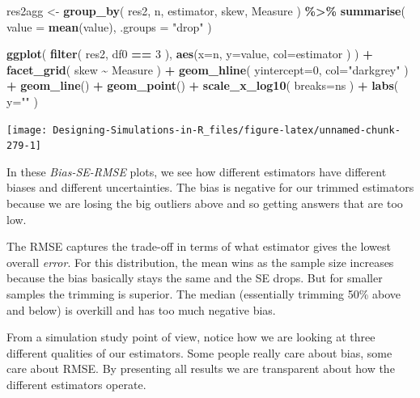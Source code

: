 \documentclass[
]{book}
\newenvironment{Shaded}{\begin{snugshade}}{\end{snugshade}}
\newcommand{\AttributeTok}[1]{\textcolor[rgb]{0.13,0.29,0.53}{#1}}
\newcommand{\DecValTok}[1]{\textcolor[rgb]{0.00,0.00,0.81}{#1}}
\newcommand{\FunctionTok}[1]{\textcolor[rgb]{0.13,0.29,0.53}{\textbf{#1}}}
\newcommand{\NormalTok}[1]{#1}
\newcommand{\OtherTok}[1]{\textcolor[rgb]{0.56,0.35,0.01}{#1}}
\newcommand{\SpecialCharTok}[1]{\textcolor[rgb]{0.81,0.36,0.00}{\textbf{#1}}}
\newcommand{\StringTok}[1]{\textcolor[rgb]{0.31,0.60,0.02}{#1}}
\begin{document}
\begin{Shaded}
\begin{Highlighting}[]
\NormalTok{res2agg }\OtherTok{\textless{}{-}} \FunctionTok{group\_by}\NormalTok{( res2, n, estimator, skew, Measure ) }\SpecialCharTok{\%\textgreater{}\%}
  \FunctionTok{summarise}\NormalTok{( }\AttributeTok{value =} \FunctionTok{mean}\NormalTok{(value), }\AttributeTok{.groups =} \StringTok{"drop"}\NormalTok{ )}

\FunctionTok{ggplot}\NormalTok{( }\FunctionTok{filter}\NormalTok{( res2, df0 }\SpecialCharTok{==} \DecValTok{3}\NormalTok{ ), }\FunctionTok{aes}\NormalTok{(}\AttributeTok{x=}\NormalTok{n, }\AttributeTok{y=}\NormalTok{value, }\AttributeTok{col=}\NormalTok{estimator ) ) }\SpecialCharTok{+}
    \FunctionTok{facet\_grid}\NormalTok{( skew }\SpecialCharTok{\textasciitilde{}}\NormalTok{ Measure ) }\SpecialCharTok{+}
    \FunctionTok{geom\_hline}\NormalTok{( }\AttributeTok{yintercept=}\DecValTok{0}\NormalTok{, }\AttributeTok{col=}\StringTok{"darkgrey"}\NormalTok{ ) }\SpecialCharTok{+}
    \FunctionTok{geom\_line}\NormalTok{() }\SpecialCharTok{+} \FunctionTok{geom\_point}\NormalTok{() }\SpecialCharTok{+}
    \FunctionTok{scale\_x\_log10}\NormalTok{( }\AttributeTok{breaks=}\NormalTok{ns ) }\SpecialCharTok{+}
    \FunctionTok{labs}\NormalTok{( }\AttributeTok{y=}\StringTok{""}\NormalTok{ )}
\end{Highlighting}
\end{Shaded}

\begin{center}\texttt{[image: Designing-Simulations-in-R\_files/figure-latex/unnamed-chunk-279-1]} \end{center}

In these \emph{Bias-SE-RMSE} plots, we see how different estimators have different biases and different
uncertainties.
The bias is negative for our trimmed estimators because we
are losing the big outliers above and so getting answers that are too low.

The RMSE captures the trade-off in terms of what estimator gives the lowest
overall \emph{error}. For this distribution, the mean wins as the sample size
increases because the bias basically stays the same and the SE drops. But
for smaller samples the trimming is superior. The median (essentially
trimming 50\% above and below) is overkill and has too much negative bias.

From a simulation study point of view, notice how we are looking at three
different qualities of our estimators. Some people really care about bias,
some care about RMSE. By presenting all results we are transparent about how
the different estimators operate.
\end{document}
